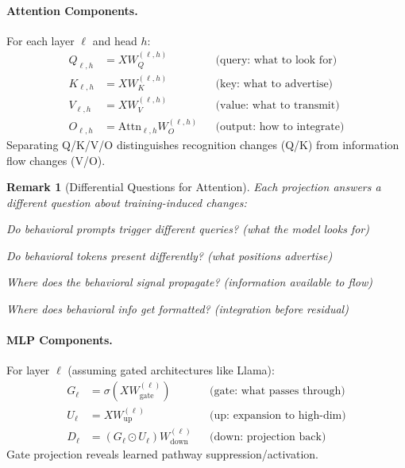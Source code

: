 \documentclass[11pt]{article}
\newtheorem{remark}{Remark}[section]
\begin{document}
\paragraph{Attention Components.}
For each layer $\ell$ and head $h$:
\begin{align}
Q_{\ell,h} &= X W^{(\ell,h)}_Q & &\text{(query: what to look for)} \\
K_{\ell,h} &= X W^{(\ell,h)}_K & &\text{(key: what to advertise)} \\
V_{\ell,h} &= X W^{(\ell,h)}_V & &\text{(value: what to transmit)} \\
O_{\ell,h} &= \text{Attn}_{\ell,h} W^{(\ell,h)}_O & &\text{(output: how to integrate)}
\end{align}
Separating Q/K/V/O distinguishes recognition changes (Q/K) from information flow changes (V/O).

\begin{remark}[Differential Questions for Attention]
\label{rem:differential-questions-attention}
Each projection answers a different question about training-induced changes:
\begin{description}[nosep, leftmargin=1em]
\item[Q:] Do behavioral prompts trigger different queries? (what the model looks for)
\item[K:] Do behavioral tokens present differently? (what positions advertise)
\item[V:] Where does the behavioral signal propagate? (information available to flow)
\item[O:] Where does behavioral info get formatted? (integration before residual)
\end{description}
\end{remark}

\paragraph{MLP Components.}
For layer $\ell$ (assuming gated architectures like Llama):
\begin{align}
G_\ell &= \sigma(X W^{(\ell)}_{\text{gate}}) & &\text{(gate: what passes through)} \\
U_\ell &= X W^{(\ell)}_{\text{up}} & &\text{(up: expansion to high-dim)} \\
D_\ell &= (G_\ell \odot U_\ell) W^{(\ell)}_{\text{down}} & &\text{(down: projection back)}
\end{align}
Gate projection reveals learned pathway suppression/activation.
\end{document}
